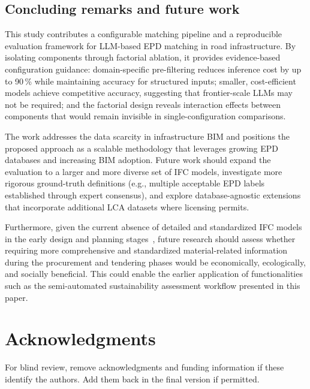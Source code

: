 \documentclass[10pt, a4paper, twocolumn]{article}
\begin{document}
\subsection{Concluding remarks and future work}

This study contributes a configurable matching pipeline and a reproducible
evaluation framework for LLM-based EPD matching in road infrastructure. By
isolating components through factorial ablation, it provides evidence-based
configuration guidance: domain-specific pre-filtering reduces inference cost by up
to 90\,\% while maintaining accuracy for structured inputs; smaller, cost-efficient
models achieve competitive accuracy, suggesting that frontier-scale LLMs may not be
required; and the factorial design reveals interaction effects between components
that would remain invisible in single-configuration comparisons.

The work addresses the data scarcity in infrastructure BIM and positions the
proposed approach as a scalable methodology that leverages growing EPD databases
and increasing BIM adoption. Future work should expand the evaluation to a larger
and more diverse set of IFC models, investigate more rigorous ground-truth
definitions (e.g., multiple acceptable EPD labels established through expert
consensus), and explore database-agnostic extensions that incorporate additional
LCA datasets where licensing permits.

Furthermore, given the current absence of detailed and standardized IFC models in the early design and planning stages~\cite{RWTHAachenUniversity.2025}, future research should assess whether requiring more comprehensive and standardized material-related information during the procurement and tendering phases would be economically, ecologically, and socially beneficial.  This could enable the earlier application of functionalities such as the semi-automated sustainability assessment workflow presented in this paper. 

\section*{Acknowledgments}

For blind review, remove acknowledgments and funding information if these
identify the authors. Add them back in the final version if permitted.





\end{document}
